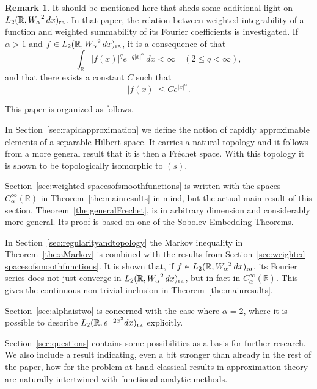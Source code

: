 \documentclass[12pt, reqno]{amsart}
\numberwithin{equation}{section}
\theoremstyle{plain}
\theoremstyle{definition}
\newtheorem{remark}[theorem]{Remark}
\begin{document}
\begin{remark}\label{rem:ditzianpaper}
It should be mentioned here that \cite{Dit} sheds some additional light on ${L_2({{\mathbb R}},{W_\alpha}^2\,dx)_{\textup{ra}}}$. In that paper, the relation between weighted integrability of a function and weighted summability of its Fourier coefficients is investigated. If $\alpha>1$ and $f\in{L_2({{\mathbb R}},{W_\alpha}^2\,dx)_{\textup{ra}}}$, it is a consequence of \cite[Theorem~2.3]{Dit} that
\begin{equation*}
\int_{{\mathbb R}} |f(x)|^q e^{-q|x|^\alpha} \,dx<\infty\quad(2\leq q <\infty),
\end{equation*}
and that there exists a constant $C$ such that
\begin{equation}\label{eq:bounded}
|f(x)|\leq C e^{|x|^\alpha}.
\end{equation}
\end{remark}

\medskip
This paper is organized as follows.

In Section~\ref{sec:rapidapproximation} we define the notion of rapidly approximable elements of a separable Hilbert space. It carries a natural topology and it follows from a more general result that it is then a Fr\'echet space. With this topology it is shown to be topologically isomorphic to $(s)$.

Section~\ref{sec:weighted spacesofsmoothfunctions} is written with the spaces ${{C_\alpha^\infty({{\mathbb R}})}}$ in Theorem~\ref{the:mainresults} in mind, but the actual main result of this section, Theorem~\ref{the:generalFrechet}, is in arbitrary dimension and considerably more general. Its proof is based on one of the Sobolev Embedding Theorems.

In Section~\ref{sec:regularityandtopology} the Markov inequality in Theorem~\ref{the:aMarkov} is combined with the results from Section~\ref{sec:weighted spacesofsmoothfunctions}. It is shown that, if $f\in{L_2({{\mathbb R}},{W_\alpha}^2\,dx)_{\textup{ra}}}$, its Fourier series does not just converge in ${L_2({{\mathbb R}},{W_\alpha}^2\,dx)_{\textup{ra}}}$, but in fact in ${{C_\alpha^\infty({{\mathbb R}})}}$. This gives the continuous non-trivial inclusion in Theorem~\ref{the:mainresults}.

Section~\ref{sec:alphaistwo} is concerned with the case where $\alpha=2$, where it is possible to describe ${L_2({{\mathbb R}},e^{-2x^2}dx)_{\textup{ra}}}$ explicitly.

Section~\ref{sec:questions} contains some possibilities as a basis for further research. We also include a result indicating, even a bit stronger than already in the rest of the paper, how for the problem at hand classical results in approximation theory are naturally intertwined with functional analytic methods.
\end{document}
